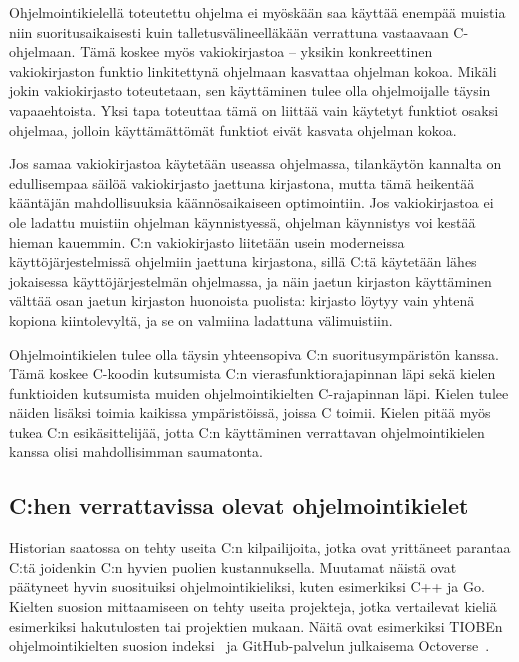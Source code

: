 Ohjelmointikielellä toteutettu ohjelma ei myöskään saa käyttää enempää muistia
niin suoritusaikaisesti kuin talletusvälineelläkään verrattuna vastaavaan
C-ohjelmaan. Tämä koskee myös vakiokirjastoa --
yksikin konkreettinen vakiokirjaston funktio linkitettynä ohjelmaan kasvattaa
ohjelman kokoa. Mikäli jokin vakiokirjasto toteutetaan, sen käyttäminen tulee
olla ohjelmoijalle täysin vapaaehtoista. Yksi tapa toteuttaa tämä on liittää
vain käytetyt funktiot osaksi ohjelmaa, jolloin käyttämättömät funktiot eivät
kasvata ohjelman kokoa.

Jos samaa vakiokirjastoa käytetään useassa ohjelmassa, tilankäytön kannalta on
edullisempaa säilöä vakiokirjasto jaettuna kirjastona, mutta tämä heikentää
kääntäjän mahdollisuuksia käännösaikaiseen optimointiin. Jos vakiokirjastoa ei
ole ladattu muistiin ohjelman käynnistyessä, ohjelman käynnistys voi kestää
hieman kauemmin. C:n vakiokirjasto liitetään usein moderneissa
käyttöjärjestelmissä ohjelmiin jaettuna kirjastona, sillä C:tä käytetään lähes
jokaisessa käyttöjärjestelmän ohjelmassa, ja näin jaetun kirjaston käyttäminen
välttää osan jaetun kirjaston huonoista puolista: kirjasto löytyy vain yhtenä
kopiona kiintolevyltä, ja se on valmiina ladattuna välimuistiin.

Ohjelmointikielen tulee olla täysin yhteensopiva C:n suoritusympäristön kanssa.
Tämä koskee C-koodin kutsumista C:n vierasfunktiorajapinnan
läpi sekä kielen funktioiden kutsumista
muiden ohjelmointikielten C-rajapinnan läpi. Kielen tulee näiden lisäksi toimia
kaikissa ympäristöissä, joissa C toimii. Kielen pitää myös tukea C:n
esikäsittelijää, jotta C:n käyttäminen verrattavan ohjelmointikielen kanssa
olisi mahdollisimman saumatonta.

\subsection{C:hen verrattavissa olevat ohjelmointikielet}

Historian saatossa on tehty useita C:n kilpailijoita, jotka ovat yrittäneet
parantaa C:tä joidenkin C:n hyvien puolien kustannuksella. Muutamat näistä ovat
päätyneet hyvin suosituiksi ohjelmointikieliksi, kuten esimerkiksi C++ ja Go.
Kielten suosion mittaamiseen on tehty useita projekteja, jotka vertailevat
kieliä esimerkiksi hakutulosten tai projektien mukaan. Näitä ovat esimerkiksi
TIOBEn ohjelmointikielten suosion indeksi~\citep{tiobe} ja GitHub-palvelun
julkaisema \mbox{Octoverse}~\citep{octoverse}.

